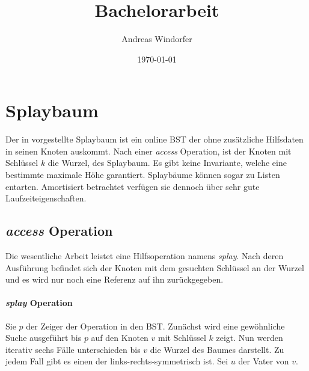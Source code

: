 \documentclass[a4paper,12pt]{article}
\title{Bachelorarbeit}
\author{

	Andreas Windorfer\\
}
\date{\today}
\begin{document}
\maketitle
\newpage

\newpage
\tableofcontents


\newpage


\section{Splaybaum}
Der in \cite{splay} vorgestellte Splaybaum ist ein online BST der ohne zusätzliche Hilfsdaten in seinen Knoten auskommt. Nach einer \textit{access} Operation, ist der Knoten mit Schlüssel $k$ die Wurzel, des Splaybaum. Es gibt keine Invariante, welche eine bestimmte maximale Höhe garantiert. Splaybäume können sogar zu Listen entarten. Amortisiert betrachtet verfügen sie dennoch über sehr gute Laufzeiteigenschaften. 


\subsection{\textit{access} Operation }
Die wesentliche Arbeit leistet eine Hilfsoperation namens \textit{splay}. Nach deren Ausführung befindet sich der Knoten mit dem gesuchten Schlüssel an der Wurzel und es wird nur noch eine Referenz auf ihn zurückgegeben.

\paragraph{\textit{splay} Operation}
Sie $p$ der Zeiger der Operation in den BST. Zunächst wird eine gewöhnliche Suche ausgeführt bis $p$ auf den Knoten $v$ mit Schlüssel $k$ zeigt. Nun werden iterativ sechs Fälle unterschieden bis $v$ die Wurzel des Baumes darstellt. Zu jedem Fall gibt es einen der links-rechts-symmetrisch ist. Sei $u$ der Vater von $v$. 
\end{document}
